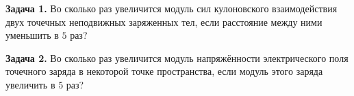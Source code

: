 
\begin{taskbasic}[code={\label{task:elem_coulomb_v23_n11}}]
\textbf{Задача 1.} Во сколько раз увеличится модуль сил кулоновского взаимодействия двух точечных неподвижных заряженных тел, если расстояние между ними уменьшить в $5$ раз?

\end{taskbasic}

\begin{taskbasic}[code={\label{task:elem_coulomb_v24_n11}}]
\textbf{Задача 2.} Во сколько раз увеличится модуль напряжённости электрического поля точечного заряда в некоторой точке пространства, если модуль этого заряда увеличить в $5$ раз?

\end{taskbasic}

